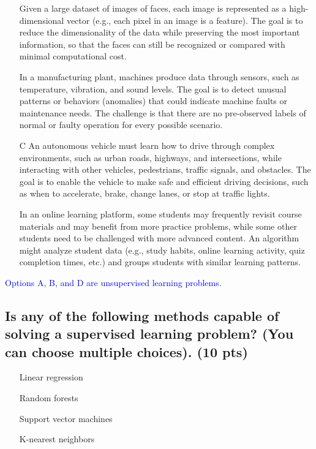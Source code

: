 \begin{itemize}
    \item[\circledtext{A}] Given a large dataset of images of faces, each image is represented as a high-dimensional vector (e.g., each pixel in an image is a feature). The goal is to reduce the dimensionality of the data while preserving the most important information, so that the faces can still be recognized or compared with minimal computational cost.
    \item[\circledtext{B}] In a manufacturing plant, machines produce data through sensors, such as temperature, vibration, and sound levels. The goal is to detect unusual patterns or behaviors (anomalies) that could indicate machine faults or maintenance needs. The challenge is that there are no pre-observed labels of normal or faulty operation for every possible scenario.
    \item[C] An autonomous vehicle must learn how to drive through complex environments, such as urban roads, highways, and intersections, while interacting with other vehicles, pedestrians, traffic signals, and obstacles. The goal is to enable the vehicle to make safe and efficient driving decisions, such as when to accelerate, brake, change lanes, or stop at traffic lights.
    \item[\circledtext{D}] In an online learning platform, some students may frequently revisit course materials and may benefit from more practice problems, while some other students need to be challenged with more advanced content. An algorithm might analyze student data (e.g., study habits, online learning activity, quiz completion times, etc.) and groups students with similar learning patterns.
\end{itemize}

\textcolor{blue}{Options A, B, and D are unsupervised learning problems.}

\subsection{Is any of the following methods capable of solving a supervised learning problem? (You can choose multiple choices). (10 pts)}

\begin{itemize}
    \item[\circledtext{A}] Linear regression
    \item[\circledtext{B}] Random forests
    \item[\circledtext{C}] Support vector machines
    \item[\circledtext{D}] K-nearest neighbors
\end{itemize}

